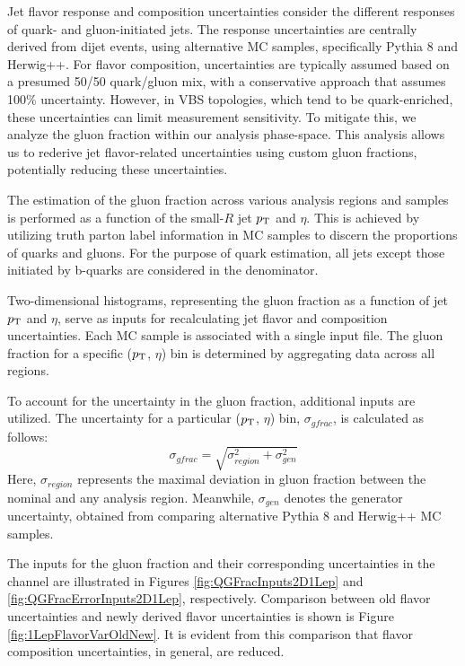 \label{subsec:bkg_uncer_qg}

Jet flavor response and composition uncertainties consider the different responses of quark- and gluon-initiated jets. 
The response uncertainties are centrally derived from dijet events, using alternative MC samples, specifically Pythia 8 and Herwig++. 
For flavor composition, uncertainties are typically assumed based on a presumed 50/50 quark/gluon mix, with a conservative approach that assumes 100\% uncertainty. However, in VBS topologies, which tend to be quark-enriched, these uncertainties can limit measurement sensitivity. 
To mitigate this, we analyze the gluon fraction within our analysis phase-space. This analysis allows us to rederive jet flavor-related uncertainties using custom gluon fractions, potentially reducing these uncertainties.

The estimation of the gluon fraction across various analysis regions and samples is performed as a function of the small-$R$ jet $p_{\text{T}}$ and $\eta$. This is achieved by utilizing truth parton label information in MC samples to discern the proportions of quarks and gluons. For the purpose of quark estimation, all jets except those initiated by b-quarks are considered in the denominator.

Two-dimensional histograms, representing the gluon fraction as a function of jet $p_{\text{T}}$ and $\eta$, serve as inputs for recalculating jet flavor and composition uncertainties. Each MC sample is associated with a single input file. The gluon fraction for a specific ($p_{\text{T}}$, $\eta$) bin is determined by aggregating data across all regions.

To account for the uncertainty in the gluon fraction, additional inputs are utilized. The uncertainty for a particular ($p_{\text{T}}$, $\eta$) bin, $\sigma_{gfrac}$, is calculated as follows:
\[
\sigma_{gfrac} = \sqrt{\sigma_{region}^{2} + \sigma_{gen}^{2}}
\]
Here, \(\sigma_{region}\) represents the maximal deviation in gluon fraction between the nominal and any analysis region. Meanwhile, \(\sigma_{gen}\) denotes the generator uncertainty, obtained from comparing alternative Pythia 8 and Herwig++ MC samples.

The inputs for the gluon fraction and their corresponding uncertainties in the \olep channel are illustrated in Figures \ref{fig:QGFracInputs2D1Lep} and \ref{fig:QGFracErrorInputs2D1Lep}, respectively. 
Comparison between old flavor uncertainties and newly derived flavor uncertainties is shown is Figure \ref{fig:1LepFlavorVarOldNew}. It is evident from this comparison that flavor composition uncertainties, in general, are reduced.


